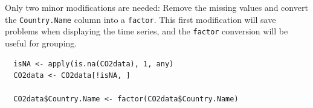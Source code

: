 \documentclass[smallroyalvopaper]{memoir}
\begin{document}
Only two minor modifications are needed: Remove the missing values and
convert the \texttt{Country.Name} column into a \texttt{factor}. This first
modification will save problems when displaying the time series, and
the \texttt{factor} conversion will be useful for grouping.
\lstset{language=r,label= ,caption= ,captionpos=b,numbers=none}
\begin{lstlisting}
  isNA <- apply(is.na(CO2data), 1, any)
  CO2data <- CO2data[!isNA, ]

  CO2data$Country.Name <- factor(CO2data$Country.Name)
\end{lstlisting}
\end{document}
